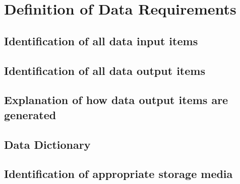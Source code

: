 \section{Definition of Data Requirements}

\subsection{Identification of all data input items}

\subsection{Identification of all data output items}

\subsection{Explanation of how data output items are generated}

\subsection{Data Dictionary}

\subsection{Identification of appropriate storage media}

\newpage

